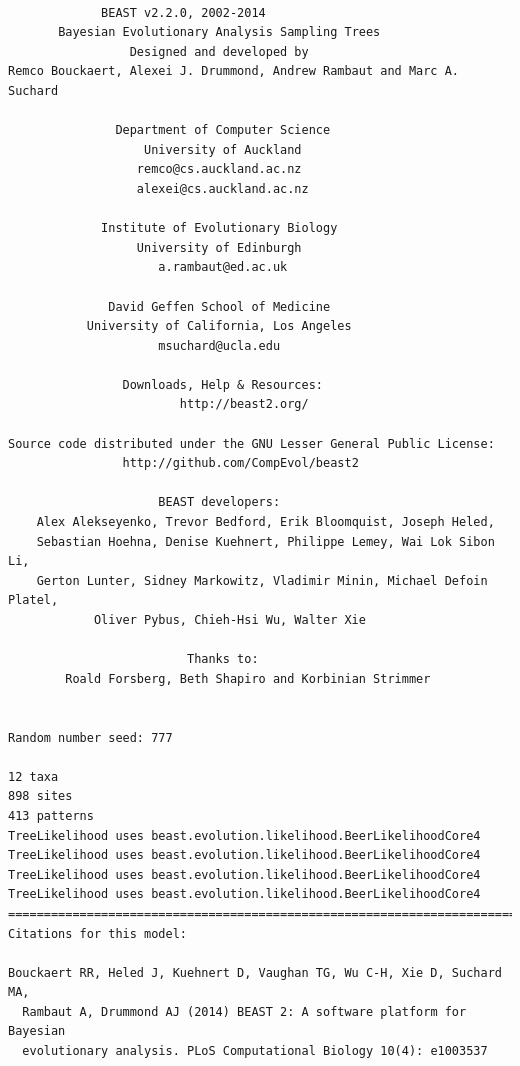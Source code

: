 \documentclass[11pt]{article}
\theoremstyle{plain}%
\theoremstyle{definition}
\theoremstyle{remark}
\begin{document}
{\tiny   
\begin{verbatim}

             BEAST v2.2.0, 2002-2014
       Bayesian Evolutionary Analysis Sampling Trees
                 Designed and developed by
Remco Bouckaert, Alexei J. Drummond, Andrew Rambaut and Marc A. Suchard
                              
               Department of Computer Science
                   University of Auckland
                  remco@cs.auckland.ac.nz
                  alexei@cs.auckland.ac.nz
                              
             Institute of Evolutionary Biology
                  University of Edinburgh
                     a.rambaut@ed.ac.uk
                              
              David Geffen School of Medicine
           University of California, Los Angeles
                     msuchard@ucla.edu
                              
                Downloads, Help & Resources:
                    	http://beast2.org/
                              
Source code distributed under the GNU Lesser General Public License:
             	http://github.com/CompEvol/beast2
                              
                     BEAST developers:
	Alex Alekseyenko, Trevor Bedford, Erik Bloomquist, Joseph Heled, 
	Sebastian Hoehna, Denise Kuehnert, Philippe Lemey, Wai Lok Sibon Li, 
	Gerton Lunter, Sidney Markowitz, Vladimir Minin, Michael Defoin Platel, 
          	Oliver Pybus, Chieh-Hsi Wu, Walter Xie
                              
                         Thanks to:
    	Roald Forsberg, Beth Shapiro and Korbinian Strimmer


Random number seed: 777

12 taxa
898 sites
413 patterns
TreeLikelihood uses beast.evolution.likelihood.BeerLikelihoodCore4
TreeLikelihood uses beast.evolution.likelihood.BeerLikelihoodCore4
TreeLikelihood uses beast.evolution.likelihood.BeerLikelihoodCore4
TreeLikelihood uses beast.evolution.likelihood.BeerLikelihoodCore4
===============================================================================
Citations for this model:

Bouckaert RR, Heled J, Kuehnert D, Vaughan TG, Wu C-H, Xie D, Suchard MA,
  Rambaut A, Drummond AJ (2014) BEAST 2: A software platform for Bayesian
  evolutionary analysis. PLoS Computational Biology 10(4): e1003537


\end{verbatim}}
\end{document}
